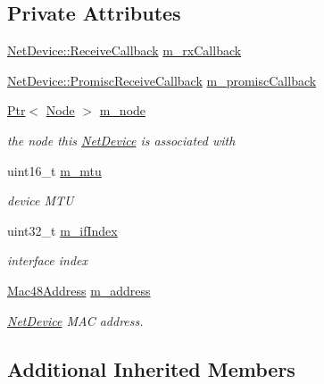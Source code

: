 \subsection*{Private Attributes}
\begin{DoxyCompactItemize}
\item 
\hyperlink{classns3_1_1NetDevice_ad5e5e1ca187472bc2ba99575d8def568}{Net\+Device\+::\+Receive\+Callback} \hyperlink{classns3_1_1LoopbackNetDevice_a844fcc47c3dc1be07aed83c8ba70a7b0}{m\+\_\+rx\+Callback}
\item 
\hyperlink{classns3_1_1NetDevice_a427225795919f26c414bee2ea3f31ed2}{Net\+Device\+::\+Promisc\+Receive\+Callback} \hyperlink{classns3_1_1LoopbackNetDevice_ac18a33947e9703ed786c83448348414c}{m\+\_\+promisc\+Callback}
\item 
\hyperlink{classns3_1_1Ptr}{Ptr}$<$ \hyperlink{classns3_1_1Node}{Node} $>$ \hyperlink{classns3_1_1LoopbackNetDevice_a5f1f7506494670806071ca51f717f297}{m\+\_\+node}
\begin{DoxyCompactList}\small\item\em the node this \hyperlink{classns3_1_1NetDevice}{Net\+Device} is associated with \end{DoxyCompactList}\item 
uint16\+\_\+t \hyperlink{classns3_1_1LoopbackNetDevice_ac2cecc3794c627c237c1ab9d2eca91db}{m\+\_\+mtu}
\begin{DoxyCompactList}\small\item\em device M\+TU \end{DoxyCompactList}\item 
uint32\+\_\+t \hyperlink{classns3_1_1LoopbackNetDevice_a223d24d108f8a9dfba19aeb64bd8cfbc}{m\+\_\+if\+Index}
\begin{DoxyCompactList}\small\item\em interface index \end{DoxyCompactList}\item 
\hyperlink{classns3_1_1Mac48Address}{Mac48\+Address} \hyperlink{classns3_1_1LoopbackNetDevice_a7d692338d3d7b73fd73f8b182af36d6b}{m\+\_\+address}
\begin{DoxyCompactList}\small\item\em \hyperlink{classns3_1_1NetDevice}{Net\+Device} M\+AC address. \end{DoxyCompactList}\end{DoxyCompactItemize}
\subsection*{Additional Inherited Members}


